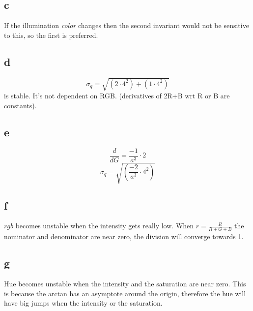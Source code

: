 \documentclass[a4paper,11pt]{article}
\begin{document}
		\subsection*{c}
			If the illumination \textit{color} changes then the second invariant would not
			be sensitive to this, so the first is preferred.

		\subsection*{d}
			\[\sigma_q = \sqrt{(2\cdot4^2)+(1\cdot4^2)}\] 
			is stable. It's not dependent on RGB. (derivatives of 2R+B wrt R or B are constants).
		\subsection*{e}
			\[\frac{d}{dG}=\frac{-1}{a^3}\cdot 2\]
			\[\sigma_q = \sqrt{(\frac{-2}{a^3}\cdot4^2)}\] 
		\subsection*{f}
			$rgb$ becomes unstable when the intensity gets really low. When $r=\frac{R}{R+G+B}$
			the nominator and denominator are near zero, the division will converge towards 1.
		\subsection*{g}
			Hue becomes unstable when the intensity and the saturation are near zero. This is
			because the arctan has an asymptote around the origin, therefore the hue will have
			big jumps when the intensity or the saturation.
\end{document}
